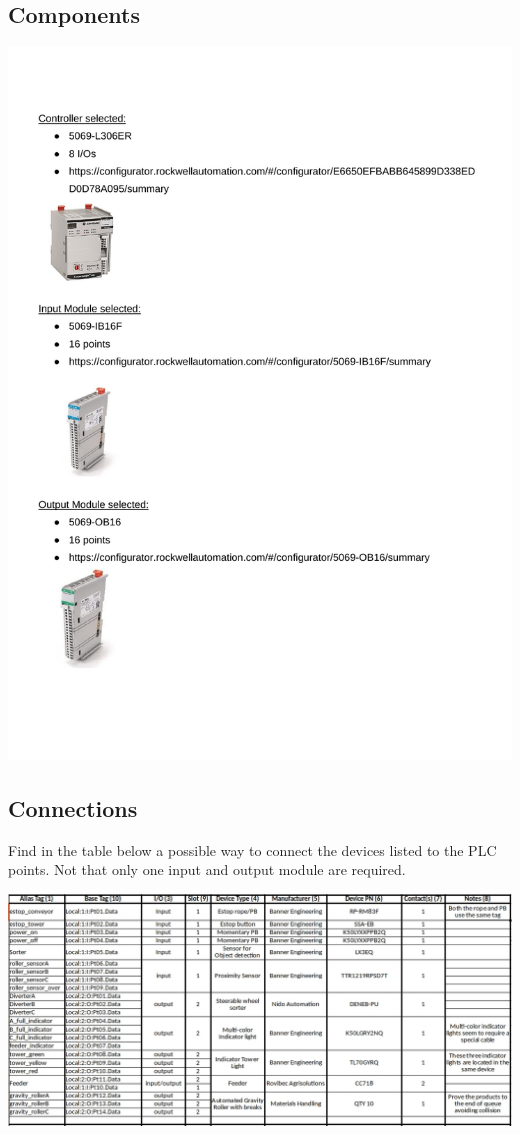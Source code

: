 \subsection*{Components}

\hspace{-2cm}
\includegraphics[scale=0.7]{external/plc3.pdf}

\subsection*{Connections}

Find in the table below a possible way to connect the devices listed to the PLC points. Not that only one input and output module are required.

\vspace{1cm}
\hspace{-3cm}\includegraphics[scale=0.67]{../external/planning.jpeg}